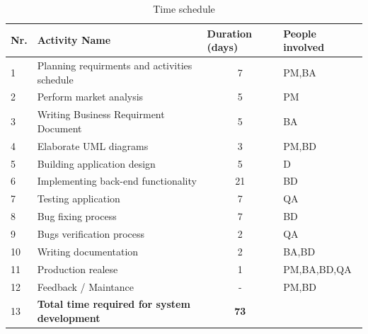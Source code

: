 \begin{table}[H]
	\centering
	\caption{Time schedule}
	\label{Time schedule}
	\begin{tabular}{|l|l|c|l|}
		\hline
		\textbf{Nr.} & \textbf{Activity Name}                              & \multicolumn{1}{l|}{\textbf{Duration (days)}} & \textbf{People involved} \\ \hline
		1            & Planning requirments and activities schedule        & 7                                             & PM,BA                    \\ \hline
		2            & Perform market analysis                             & 5                                             & PM                       \\ \hline
		3            & Writing Business Requirment Document                & 5                                             & BA                       \\ \hline
		4            & Elaborate UML diagrams                              & 3                                             & PM,BD                    \\ \hline
		5            & Building application design                         & 5                                             & D                        \\ \hline
		6            & Implementing back-end functionality                 & 21                                            & BD                       \\ \hline
		7            & Testing application                                 & 7                                             & QA                       \\ \hline
		8            & Bug fixing process                                  & 7                                             & BD                    \\ \hline
		9            & Bugs verification process                                  & 2                                             & QA                    \\ \hline
		10           & Writing documentation                               & 2                                             & BA,BD                 \\ \hline
		11           & Production realese                                  & 1                                             & PM,BA,BD,QA              \\ \hline
		12           & Feedback / Maintance                                & -                                             & PM,BD                    \\ \hline
		13           & \textbf{Total time required for system development} & \textbf{73}                                   &                          \\ \hline
	\end{tabular}
\end{table}
